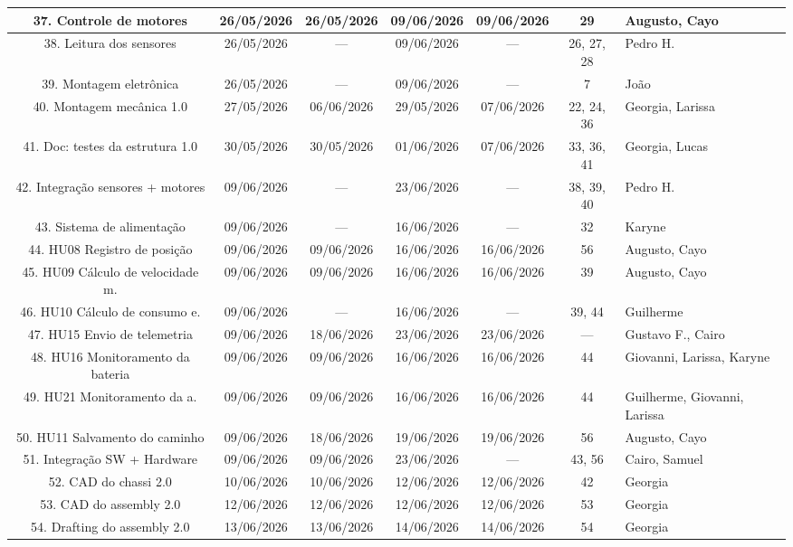 \begin{landscape}
\begin{center}
\begin{longtable}{|c|c|c|c|c|c|p{3.6cm}|}
37. Controle de motores & 26/05/2026 & 26/05/2026 & 09/06/2026 & 09/06/2026 & 29 & Augusto, Cayo \\ \hline
38. Leitura dos sensores & 26/05/2026 & --- & 09/06/2026 & --- & 26, 27, 28 & Pedro H. \\ \hline
39. Montagem eletrônica & 26/05/2026 & --- & 09/06/2026 & --- & 7 & João \\ \hline
40. Montagem mecânica 1.0 & 27/05/2026 & 06/06/2026 & 29/05/2026 & 07/06/2026 & 22, 24, 36 & Georgia, Larissa \\ \hline
41. Doc: testes da estrutura 1.0 & 30/05/2026 & 30/05/2026 & 01/06/2026 & 07/06/2026 & 33, 36, 41 & Georgia, Lucas \\ \hline
42. Integração sensores + motores & 09/06/2026 & --- & 23/06/2026 & --- & 38, 39, 40 & Pedro H. \\ \hline
43. Sistema de alimentação & 09/06/2026 & --- & 16/06/2026 & --- & 32 & Karyne \\ \hline
44. HU08 Registro de posição & 09/06/2026 & 09/06/2026 & 16/06/2026 & 16/06/2026 & 56 & Augusto, Cayo \\ \hline
45. HU09 Cálculo de velocidade m. & 09/06/2026 & 09/06/2026 & 16/06/2026 & 16/06/2026 & 39 & Augusto, Cayo \\ \hline
46. HU10 Cálculo de consumo e. & 09/06/2026 & --- & 16/06/2026 & --- & 39, 44 & Guilherme \\ \hline
47. HU15 Envio de telemetria & 09/06/2026 & 18/06/2026 & 23/06/2026 & 23/06/2026 & --- & Gustavo F., Cairo \\ \hline
48. HU16 Monitoramento da bateria & 09/06/2026 & 09/06/2026 & 16/06/2026 & 16/06/2026 & 44 & Giovanni, Larissa, Karyne \\ \hline
49. HU21 Monitoramento da a. & 09/06/2026 & 09/06/2026 & 16/06/2026 & 16/06/2026 & 44 & Guilherme, Giovanni, Larissa \\ \hline
50. HU11 Salvamento do caminho & 09/06/2026 & 18/06/2026 & 19/06/2026 & 19/06/2026 & 56 & Augusto, Cayo \\ \hline
51. Integração SW + Hardware & 09/06/2026 & 09/06/2026 & 23/06/2026 & --- & 43, 56 & Cairo, Samuel \\ \hline
52. CAD do chassi 2.0 & 10/06/2026 & 10/06/2026 & 12/06/2026 & 12/06/2026 & 42 & Georgia \\ \hline
53. CAD do assembly 2.0 & 12/06/2026 & 12/06/2026 & 12/06/2026 & 12/06/2026 & 53 & Georgia \\ \hline
54. Drafting do assembly 2.0 & 13/06/2026 & 13/06/2026 & 14/06/2026 & 14/06/2026 & 54 & Georgia \\ \hline

\end{longtable}
\end{center}
\end{landscape}
